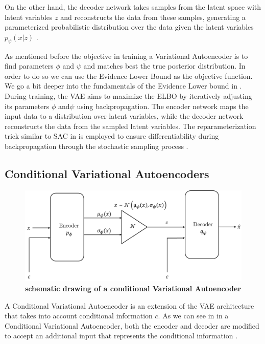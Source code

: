 On the other hand, the decoder network takes samples from the latent space with latent variables $z$ and reconstructs the data from these samples, generating a parameterized probabilistic distribution over the data given the latent variables $p_\psi(x|z)$ \cite{pml2Book}.

As mentioned before the objective in training a Variational Autoencoder is to find parameters $\phi$ and $\psi$ and matches best the true posterior distribution. In order to do so we can use the Evidence Lower Bound as the objective function. We go a bit deeper into the fundamentals of the Evidence Lower bound in . \\
During training, the VAE aims to maximize the ELBO by iteratively adjusting its parameters $\phi$ and$\psi$ using backpropagation. The encoder network maps the input data to a distribution over latent variables, while the decoder network reconstructs the data from the sampled latent variables. The reparameterization trick similar to SAC in  is employed to ensure differentiability during backpropagation through the stochastic sampling process \cite{pml2Book}.



\subsection{Conditional Variational Autoencoders}

\begin{figure}
    \begin{center}
        \includegraphics[width=0.7\linewidth]{figures/background/CVAE.png}
        \caption[Conditional Variational Autoencoder schematics]{\textbf{schematic drawing of a conditional Variational Autoencoder}}
        \label{fig:conditional-Variational_Autoencoder_schematics}
    \end{center}
\end{figure}
A Conditional Variational Autoencoder is an extension of the VAE architecture that takes into account conditional information $c$. As we can see in  in a Conditional Variational Autoencoder, both the encoder and decoder are modified to accept an additional input that represents the conditional information \cite{CVAE}. 


